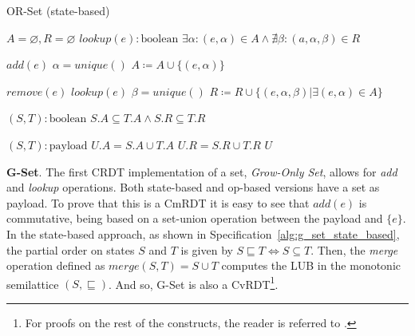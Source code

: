 \begin{algorithm}[t]
\small{
	\caption{OR-Set (state-based)}
 	\label{alg:or_set_state_based}                       

 	\begin{algorithmic}[1]
 	  \State \Payload $A = \varnothing, R = \varnothing$
 	  \State \Query $lookup(e) : \text{boolean}$
 	  \State \hspace{\algorithmicindent} \Return $\exists \alpha : (e, \alpha) \in A \land \nexists \beta : (a, \alpha, \beta) \in R$
 	  
 	  \State \Update $add(e)$
 	  \State \hspace{\algorithmicindent} \Let $\alpha = unique()$
 	  \State \hspace{\algorithmicindent} $A \coloneqq A \cup \{(e, \alpha)\}$
 	  
 	  \State \Update $remove(e)$
 	  \State \hspace{\algorithmicindent} \Pre $lookup(e)$
 	  \State \hspace{\algorithmicindent} \Let $\beta = unique()$
 	  \State \hspace{\algorithmicindent} $R \coloneqq R \cup \{(e, \alpha, \beta) | \exists (e, \alpha) \in A\}$
 	  
 	  \State \Compare $(S, T) : \text{boolean}$
 	  \State \hspace{\algorithmicindent} \Return $S.A \subseteq T.A \land S.R \subseteq T.R$ 
 	  
 	  \State \Merge $(S, T) : \text{payload}$
 	  \State \hspace{\algorithmicindent} \Let $U.A = S.A \cup T.A$
 	  \State \hspace{\algorithmicindent} \Let $U.R = S.R \cup T.R$
 	  \State \hspace{\algorithmicindent} \Return $U$
	\end{algorithmic}
 }
\end{algorithm}

\textbf{G-Set}. The first CRDT implementation of a set, \textit{Grow-Only Set},
allows for \textit{add} and \textit{lookup} operations. Both state-based and
op-based versions have a set as payload. To prove that this is a CmRDT it is
easy to see that $\textit{add}(e)$ is commutative, being based on a set-union
operation between the payload and $\{e\}$. In the state-based approach, as shown
in Specification~\ref{alg:g_set_state_based}, the partial order on states $S$
and $T$ is given by $S \sqsubseteq T \iff S \subseteq T$. Then, the
\textit{merge} operation defined as $\textit{merge}(S,T) = S \cup T$ computes
the LUB in the monotonic semilattice $(S, \sqsubseteq)$. And so, G-Set is also a
CvRDT\footnote{For proofs on the rest of the constructs, the reader is
referred to \cite{shapiro:inria-00555588}.}.

